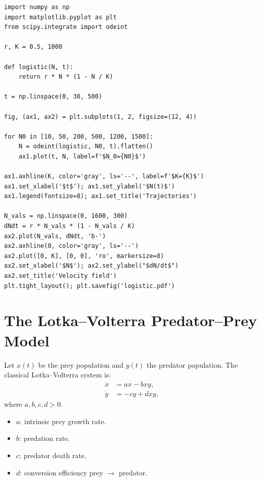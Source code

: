 \begin{codeblock}[title=\textbf{Logistic growth and phase portrait}]
\begin{verbatim}
import numpy as np
import matplotlib.pyplot as plt
from scipy.integrate import odeint

r, K = 0.5, 1000

def logistic(N, t):
    return r * N * (1 - N / K)

t = np.linspace(0, 30, 500)

fig, (ax1, ax2) = plt.subplots(1, 2, figsize=(12, 4))

for N0 in [10, 50, 200, 500, 1200, 1500]:
    N = odeint(logistic, N0, t).flatten()
    ax1.plot(t, N, label=f'$N_0={N0}$')

ax1.axhline(K, color='gray', ls='--', label=f'$K={K}$')
ax1.set_xlabel('$t$'); ax1.set_ylabel('$N(t)$')
ax1.legend(fontsize=8); ax1.set_title('Trajectories')

N_vals = np.linspace(0, 1600, 300)
dNdt = r * N_vals * (1 - N_vals / K)
ax2.plot(N_vals, dNdt, 'b-')
ax2.axhline(0, color='gray', ls='--')
ax2.plot([0, K], [0, 0], 'ro', markersize=8)
ax2.set_xlabel('$N$'); ax2.set_ylabel("$dN/dt$")
ax2.set_title('Velocity field')
plt.tight_layout(); plt.savefig('logistic.pdf')
\end{verbatim}
\end{codeblock}

\section{The Lotka--Volterra Predator--Prey Model}
\label{sec:lotka_volterra}

\begin{definition}
Let $x(t)$ be the prey population and $y(t)$ the predator population.
The classical Lotka--Volterra system is:
\begin{align}
  \dot{x} &= ax - bxy, \label{eq:lv_prey} \\
  \dot{y} &= -cy + dxy, \label{eq:lv_pred}
\end{align}
where $a,b,c,d>0$.
\begin{itemize}
  \item $a$: intrinsic prey growth rate.
  \item $b$: predation rate.
  \item $c$: predator death rate.
  \item $d$: conversion efficiency prey $\to$ predator.
\end{itemize}
\end{definition}

